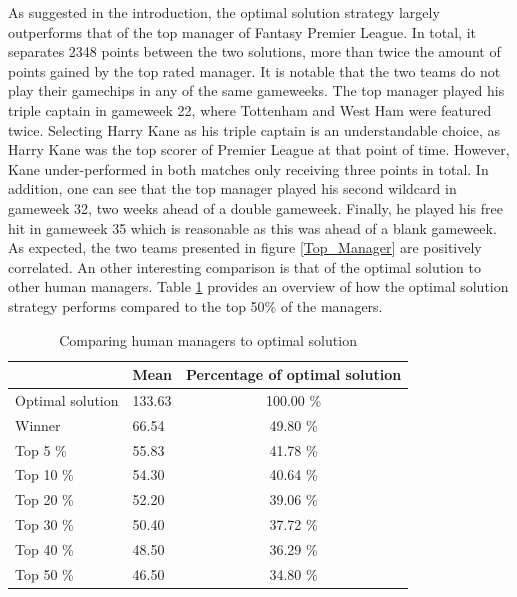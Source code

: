 As suggested in the introduction, the optimal solution strategy largely outperforms that of the top manager of Fantasy Premier League. In total, it separates 2348 points between the two solutions, more than twice the amount of points gained by the top rated manager. It is notable that the two teams do not play their gamechips in any of the same gameweeks. The top manager played his triple captain in gameweek 22, where Tottenham and West Ham were featured twice. Selecting Harry Kane as his triple captain is an understandable choice, as Harry Kane was the top scorer of Premier League at that point of time. However, Kane under-performed in both matches only receiving three points in total. In addition, one can see that the top manager played his second wildcard in gameweek 32, two weeks ahead of a double gameweek. Finally, he played his free hit in gameweek 35 which is reasonable as this was ahead of a blank gameweek. As expected, the two teams presented in figure \ref{Top_Manager} are positively correlated.   
\newpar
An other interesting comparison is that of the optimal solution to other human managers. Table \ref{Optimal_Human} provides an overview of how the optimal solution strategy performs compared to the top 50\% of the managers. 

\begin{table}[H]
\centering
\caption{Comparing human managers to optimal solution}
\label{Optimal_Human}
\begin{tabular}{llc}
\hline
                 & Mean   & \multicolumn{1}{l}{Percentage of optimal solution} \\
\hline                 
Optimal solution & 133.63 & 100.00 \%                                          \\
Winner           & 66.54  & 49.80 \%                                           \\
Top 5 \%         & 55.83  & 41.78 \%                                           \\
Top 10 \%        & 54.30  & 40.64 \%                                           \\
Top 20 \%        & 52.20  & 39.06 \%                                           \\
Top 30 \%        & 50.40  & 37.72 \%                                           \\
Top 40 \%        & 48.50  & 36.29 \%                                           \\
Top 50 \%        & 46.50  & 34.80 \%                                           \\
\hline
\end{tabular}
\end{table}

